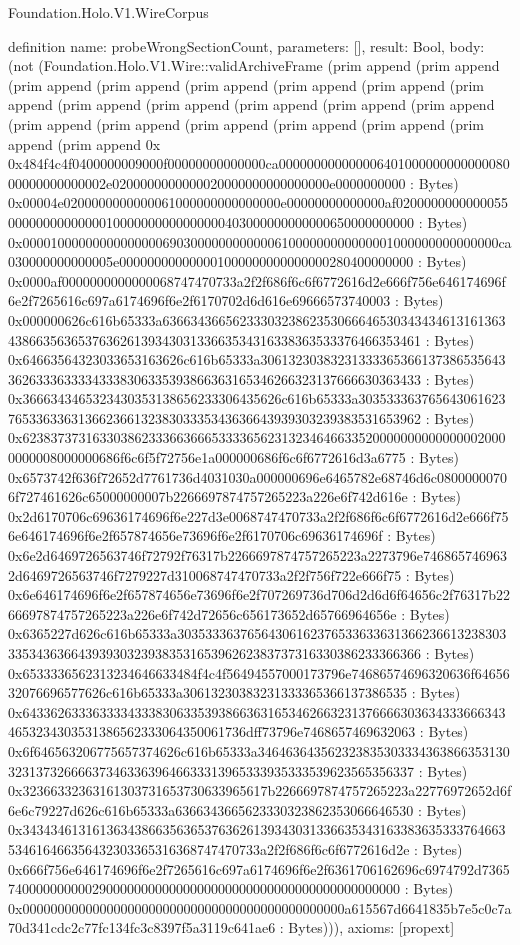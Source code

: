 \begin{lexlean}{Foundation.Holo.V1.WireCorpus}
\begin{semanticmodule}
definition{
  name: probeWrongSectionCount,
  parameters: [],
  result: Bool,
  body: (not (Foundation.Holo.V1.Wire::validArchiveFrame (prim append (prim append (prim append (prim append (prim append (prim append (prim append (prim append (prim append (prim append (prim append (prim append (prim append (prim append (prim append (prim append (prim append (prim append (prim append (prim append 0x 0x484f4c4f0400000009000f00000000000000ca00000000000000640100000000000008000000000000002e0200000000000020000000000000000e0000000000 : Bytes) 0x00004e0200000000000061000000000000000e00000000000000af02000000000000550000000000000010000000000000000403000000000000650000000000 : Bytes) 0x00001000000000000000690300000000000061000000000000001000000000000000ca030000000000005e000000000000001000000000000000280400000000 : Bytes) 0x0000af0000000000000068747470733a2f2f686f6c6f6772616d2e666f756e646174696f6e2f7265616c697a6174696f6e2f6170702d6d616e69666573740003 : Bytes) 0x000000626c616b65333a636634366562333032386235306664653034343461316136343866356365376362613934303133663534316338363533376466353461 : Bytes) 0x64663564323033653163626c616b65333a3061323038323133336536613738653564336263336333343338306335393866363165346266323137666630363433 : Bytes) 0x3666343465323430353138656233306435626c616b65333a30353336376564306162376533633631366236613238303335343636643939303239383531653962 : Bytes) 0x6238373731633038623336636665333365623132346466335200000000000000020000000008000000686f6c6f5f72756e1a000000686f6c6f6772616d3a6775 : Bytes) 0x6573742f636f72652d7761736d4031030a000000696e6465782e68746d6c08000000706f727461626c65000000007b2266697874757265223a226e6f742d616e : Bytes) 0x2d6170706c69636174696f6e227d3e0068747470733a2f2f686f6c6f6772616d2e666f756e646174696f6e2f657874656e73696f6e2f6170706c69636174696f : Bytes) 0x6e2d6469726563746f72792f76317b2266697874757265223a2273796e7468657469632d6469726563746f7279227d310068747470733a2f2f756f722e666f75 : Bytes) 0x6e646174696f6e2f657874656e73696f6e2f707269736d706d2d6d6f64656c2f76317b2266697874757265223a226e6f742d72656c656173652d65766964656e : Bytes) 0x6365227d626c616b65333a3035333637656430616237653363363136623661323830333534363664393930323938353165396262383737316330386233366366 : Bytes) 0x6533336562313234646633484f4c4f56494557000173796e74686574696320636f6465632076696577626c616b65333a30613230383231333365366137386535 : Bytes) 0x6433626333633334333830633539386636316534626632313766663036343336663434653234303531386562333064350061736dff73796e7468657469632063 : Bytes) 0x6f646563206775657374626c616b65333a3464636435623238353033343638663531303231373266663734633639646633313965333935333539623565356337 : Bytes) 0x32366332363161303731653730633965617b2266697874757265223a22776972652d6f6e6c79227d626c616b65333a6366343665623330323862353066646530 : Bytes) 0x343434613161363438663563653763626139343031336635343163383635333764663534616466356432303365316368747470733a2f2f686f6c6f6772616d2e : Bytes) 0x666f756e646174696f6e2f7265616c697a6174696f6e2f6361706162696c6974792d736574000000000029000000000000000000000000000000000000000000 : Bytes) 0x0000000000000000000000000000000000000000000000a615567d6641835b7e5c0c7a70d341cdc2c77fc134fc3c8397f5a3119c641ae6 : Bytes))),
  axioms: [propext]
}


\end{semanticmodule}
\end{lexlean}
